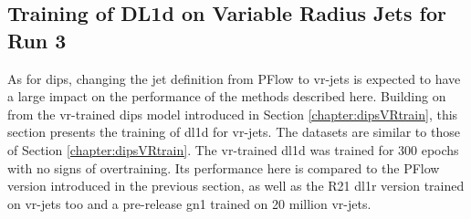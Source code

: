 \subsection{Training of DL1d on Variable Radius Jets for Run 3}\label{sec:VRdl1dTrain}
As for \gls{dips}, changing the jet definition from PFlow to \gls{vr}-jets is expected to have a large impact on the performance of the methods described here. Building on from the \gls{vr}-trained \gls{dips} model introduced in Section \ref{chapter:dipsVRtrain}, this section presents the training of \gls{dl1d} for \gls{vr}-jets. The datasets are similar to those of Section \ref{chapter:dipsVRtrain}. The \gls{vr}-trained \gls{dl1d} was trained for 300 epochs with no signs of overtraining. Its performance here is compared to the PFlow version introduced in the previous section, as well as the R21 \gls{dl1r} version trained on \gls{vr}-jets too and a pre-release \gls{gn1} trained on 20 million \gls{vr}-jets.

